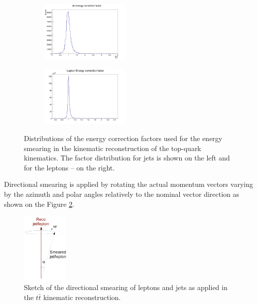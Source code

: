 \begin{figure}[t]
\centering
\begin{subfigure}
  \centering
  \includegraphics[width=0.48\textwidth]{05_kinReco/plots/fE_jet.png}
\end{subfigure}
\begin{subfigure}
  \centering
  \includegraphics[width=0.48\textwidth]{05_kinReco/plots/fE_lep.png}
\end{subfigure}
\caption{Distributions of the energy correction factors used for the energy smearing in the kinematic
reconstruction of the top-quark kinematics. The factor distribution for jets is shown on the left and for
the leptons -- on the right.}
\label{fig:fE}
\end{figure}

Directional smearing is applied by rotating the actual momentum vectors varying by the azimuth and polar angles relatively to the nominal vector direction
as shown on the Figure \ref{fig:angleRot}. 
\begin{figure}[h]
 \centering
 \includegraphics[width=0.2\textwidth]{05_kinReco/plots/angle_rot.pdf}
 \caption{Sketch of the directional smearing of leptons and jets as applied in the $t\bar{t}$ kinematic reconstruction.}
 \label{fig:angleRot}
\end{figure}

